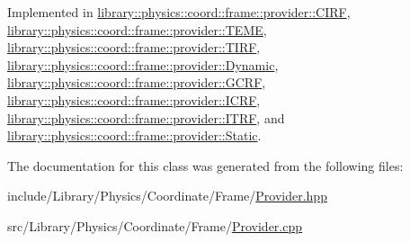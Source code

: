 Implemented in \hyperlink{classlibrary_1_1physics_1_1coord_1_1frame_1_1provider_1_1_c_i_r_f_ab5676de1c31ad796d56a684615fabdf8}{library\+::physics\+::coord\+::frame\+::provider\+::\+C\+I\+RF}, \hyperlink{classlibrary_1_1physics_1_1coord_1_1frame_1_1provider_1_1_t_e_m_e_a8c52ea8c59a669197234383e4bfa54b6}{library\+::physics\+::coord\+::frame\+::provider\+::\+T\+E\+ME}, \hyperlink{classlibrary_1_1physics_1_1coord_1_1frame_1_1provider_1_1_t_i_r_f_a3656639fda8a7b991335752559d7594b}{library\+::physics\+::coord\+::frame\+::provider\+::\+T\+I\+RF}, \hyperlink{classlibrary_1_1physics_1_1coord_1_1frame_1_1provider_1_1_dynamic_a0527b3fd86cdd8070f1697c057f06479}{library\+::physics\+::coord\+::frame\+::provider\+::\+Dynamic}, \hyperlink{classlibrary_1_1physics_1_1coord_1_1frame_1_1provider_1_1_g_c_r_f_a0e6155c096ff1c231b14e59544fe038c}{library\+::physics\+::coord\+::frame\+::provider\+::\+G\+C\+RF}, \hyperlink{classlibrary_1_1physics_1_1coord_1_1frame_1_1provider_1_1_i_c_r_f_a533e5d0240150b5c23080ee8bf89d040}{library\+::physics\+::coord\+::frame\+::provider\+::\+I\+C\+RF}, \hyperlink{classlibrary_1_1physics_1_1coord_1_1frame_1_1provider_1_1_i_t_r_f_a10a6a129ab5410f3ad3d687f73ba6d8e}{library\+::physics\+::coord\+::frame\+::provider\+::\+I\+T\+RF}, and \hyperlink{classlibrary_1_1physics_1_1coord_1_1frame_1_1provider_1_1_static_a508f20f859dbc43759ab64e03b5befa1}{library\+::physics\+::coord\+::frame\+::provider\+::\+Static}.



The documentation for this class was generated from the following files\+:\begin{DoxyCompactItemize}
\item 
include/\+Library/\+Physics/\+Coordinate/\+Frame/\hyperlink{_provider_8hpp}{Provider.\+hpp}\item 
src/\+Library/\+Physics/\+Coordinate/\+Frame/\hyperlink{_provider_8cpp}{Provider.\+cpp}\end{DoxyCompactItemize}
